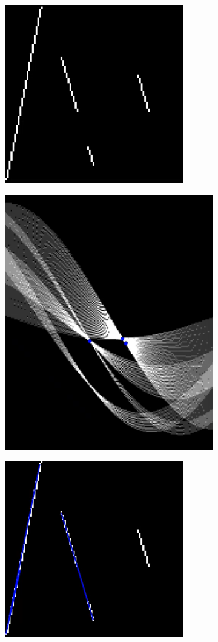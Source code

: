 \documentclass[a4paper,11pt]{article}
\begin{document}
\renewcommand{\thefigure}{10.8}
\begin{figure}[!h]
\centering
\begin{subfigure}{.3\textwidth}
  \centering
  \includegraphics[scale=0.4]{images/10/starting_image_three_lines.png}
\end{subfigure}%
\begin{subfigure}{.3\textwidth}
  \centering
  \includegraphics[scale=0.4]{images/10/generated_sinusoids_three_lines.png}
\end{subfigure}%
\begin{subfigure}{.3\textwidth}
  \centering
  \includegraphics[scale=0.4]{images/10/three_lines_final_result.png}

\end{subfigure}
\end{figure}
\end{document}
